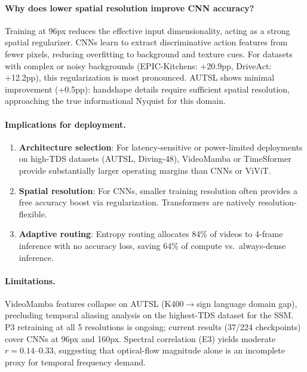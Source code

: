 \documentclass[runningheads]{llncs}
\begin{document}
\paragraph{Why does lower spatial resolution improve CNN accuracy?}
Training at 96px reduces the effective input dimensionality, acting as a strong
spatial regularizer.
CNNs learn to extract discriminative action features from fewer pixels, reducing
overfitting to background and texture cues.
For datasets with complex or noisy backgrounds (EPIC-Kitchens: +20.9pp,
DriveAct: +12.2pp), this regularization is most pronounced.
AUTSL shows minimal improvement (+0.5pp): handshape details require sufficient
spatial resolution, approaching the true informational Nyquist for this domain.

\paragraph{Implications for deployment.}
\begin{enumerate}[leftmargin=*,itemsep=2pt,topsep=2pt]
\item \textbf{Architecture selection}: For latency-sensitive or power-limited
  deployments on high-TDS datasets (AUTSL, Diving-48), VideoMamba or TimeSformer
  provide substantially larger operating margins than CNNs or ViViT.
\item \textbf{Spatial resolution}: For CNNs, smaller training resolution often
  provides a free accuracy boost via regularization. Transformers are natively
  resolution-flexible.
\item \textbf{Adaptive routing}: Entropy routing allocates 84\% of videos to 4-frame
  inference with no accuracy loss, saving 64\% of compute vs.\ always-dense inference.
\end{enumerate}

\paragraph{Limitations.}
VideoMamba features collapse on AUTSL (K400$\to$sign language domain gap),
precluding temporal aliasing analysis on the highest-TDS dataset for the SSM.
P3 retraining at all 5 resolutions is ongoing; current results (37/224 checkpoints)
cover CNNs at 96px and 160px.
Spectral correlation (E3) yields moderate $r = 0.14$--$0.33$, suggesting that
optical-flow magnitude alone is an incomplete proxy for temporal frequency demand.

\end{document}
